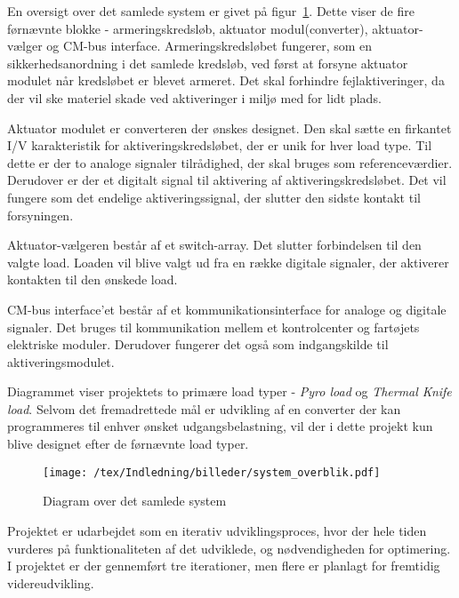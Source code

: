 En oversigt over det samlede system er givet på figur~\ref{fig:system_overblik}. Dette viser de fire førnævnte blokke - armeringskredsløb, aktuator modul(converter), aktuator-vælger og CM-bus interface. Armeringskredsløbet fungerer, som en sikkerhedsanordning i det samlede kredsløb, ved først at forsyne aktuator modulet når kredsløbet er blevet armeret. Det skal forhindre fejlaktiveringer, da der vil ske materiel skade ved aktiveringer i miljø med for lidt plads. 

Aktuator modulet er converteren der ønskes designet. Den skal sætte en firkantet I/V karakteristik for aktiveringskredsløbet, der er unik for hver load type. Til dette er der to analoge signaler tilrådighed, der skal bruges som referenceværdier. Derudover er der et digitalt signal til aktivering af aktiveringskredsløbet. Det vil fungere som det endelige aktiveringssignal, der slutter den sidste kontakt til forsyningen. 

Aktuator-vælgeren består af et switch-array. Det slutter forbindelsen til den valgte load. Loaden vil blive valgt ud fra en række digitale signaler, der aktiverer kontakten til den ønskede load.

CM-bus interface'et består af et kommunikationsinterface for analoge og digitale signaler. Det bruges til kommunikation mellem et kontrolcenter og fartøjets elektriske moduler. Derudover fungerer det også som indgangskilde til aktiveringsmodulet. 

Diagrammet viser projektets to primære load typer - \textit{Pyro load} og \textit{Thermal Knife load}. Selvom det fremadrettede mål er udvikling af en converter der kan programmeres til enhver ønsket udgangsbelastning, vil der i dette projekt kun blive designet efter de førnævnte load typer.

\begin{figure}[H]
	\center
	\texttt{[image: /tex/Indledning/billeder/system\_overblik.pdf]}
	\caption{Diagram over det samlede system}
	\label{fig:system_overblik}
\end{figure}

Projektet er udarbejdet som en iterativ udviklingsproces, hvor der hele tiden vurderes på funktionaliteten af det udviklede, og nødvendigheden for optimering. I projektet er der gennemført tre iterationer, men flere er planlagt for fremtidig videreudvikling. 




\clearpage

